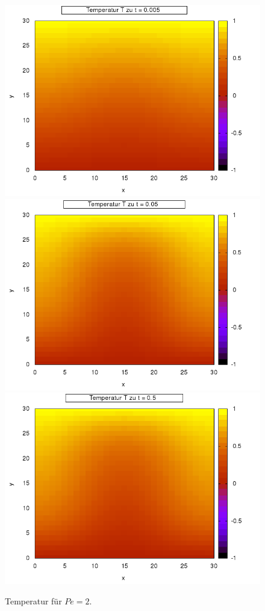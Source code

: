 \documentclass[12pt,a4paper,titlepage,headinclude,bibtotoc]{scrartcl}
\begin{document}
\noindent\begin{minipage}[t]{0.50\textwidth}%
\begin{figure}[H]  
   \includegraphics[width=\linewidth]{res/task4/2_0005.png}
   \includegraphics[width=\linewidth]{res/task4/2_005.png}
   \includegraphics[width=\linewidth]{res/task4/2_05.png}
   \caption{Temperatur für $Pe = 2$.}
   \label{fig:task4_2}
   \end{figure}
   \vspace{1cm}
\end{minipage}%
\end{document}
